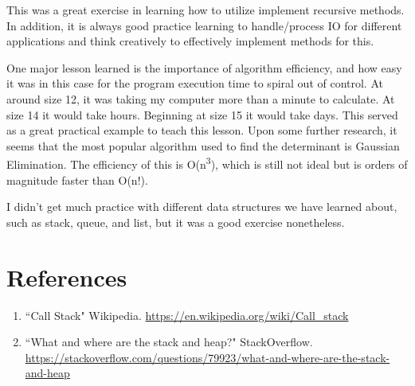 \documentclass[12pt, titlepage]{article}
\begin{document}
This was a great exercise in learning how to utilize implement recursive methods. In addition, it is always good practice learning to handle/process IO for different applications and think creatively to effectively implement methods for this.

One major lesson learned is the importance of algorithm efficiency, and how easy it was in this case for the program execution time to spiral out of control. At around size 12, it was taking my computer more than a minute to calculate. At size 14 it would take hours. Beginning at size 15 it would take days. This served as a great practical example to teach this lesson. Upon some further research, it seems that the most popular algorithm used to find the determinant is Gaussian Elimination. The efficiency of this is O(n\textsuperscript{3}), which is still not ideal but is orders of magnitude faster than O(n!).

I didn't get much practice with different data structures we have learned about, such as stack, queue, and list, but it was a good exercise nonetheless.

\newpage

\section{References}
\begin{enumerate}
	\item ``Call Stack" Wikipedia. \url{https://en.wikipedia.org/wiki/Call_stack}
	\item ``What and where are the stack and heap?" StackOverflow. \url{https://stackoverflow.com/questions/79923/what-and-where-are-the-stack-and-heap}
\end{enumerate}
\end{document}
